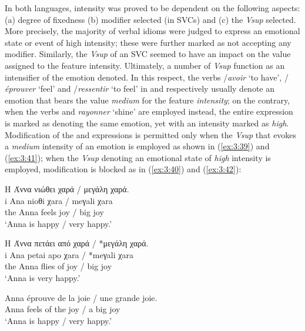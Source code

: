 \documentclass[output=paper]{langsci/langscibook}
\begin{document}
In both languages, intensity was proved to be dependent on the following
aspects: (a) degree of fixedness (b) modifier selected (in SVCs) and
(c) the \textit{Vsup} selected. More precisely, the majority of verbal
idioms were judged to express an emotional state or event of high
intensity; these were further marked as not accepting any modifier.
Similarly, the \textit{Vsup} of an SVC seemed to have an impact on the
value assigned to the feature intensity. Ultimately, a number of
\textit{Vsup} function as an intensifier of the emotion denoted. In
this respect, the verbs 
/\textit{avoir} ‘to have’,
/\textit{éprouver} ‘feel’ and 
/\textit{ressentir} ‘to
feel’ in  and  respectively usually denote an emotion that bears
the value \textit{medium} for the feature \textit{intensity}; on the
contrary, when the verbs 
 and \textit{rayonner}
‘shine’ are employed instead, the entire expression is marked as
denoting the same emotion, yet with an intensity marked as
\textit{high}. Modification of the  and  expressions is permitted
only when the \textit{Vsup} that evokes a \textit{medium} intensity of an
emotion is employed as shown in (\ref{ex:3:39}) and (\ref{ex:3:41}); when the \textit{Vsup} denoting
an emotional state of \textit{high} intensity is employed, modification
is blocked as in (\ref{ex:3:40}) and (\ref{ex:3:42}):


\begin{exe}
\ex \label{ex:3:39}
\glll H Άννα νιώθει χαρά / μεγάλη χαρά. \\
 i Ana nioθi χara / meγali χara\\
 the Anna feels joy / big joy\\
\glt %
‘Anna is happy / very happy.’
\end{exe}

\begin{exe}
\ex \label{ex:3:40}
\glll H Άννα πετάει από χαρά / *μεγάλη χαρά. {} {} {}\\
i Ana petai apo χara / *meγali χara {} {} {}\\
the Anna flies of joy / big joy \\
\glt %
‘Anna is very happy.’
\end{exe}

\begin{exe}
\ex \label{ex:3:41}
\gll Anna éprouve de la joie / une grande joie. \\
 Anna feels of the joy / a big joy\\
\glt ‘Anna is happy / very happy.’
\end{exe}
\end{document}

